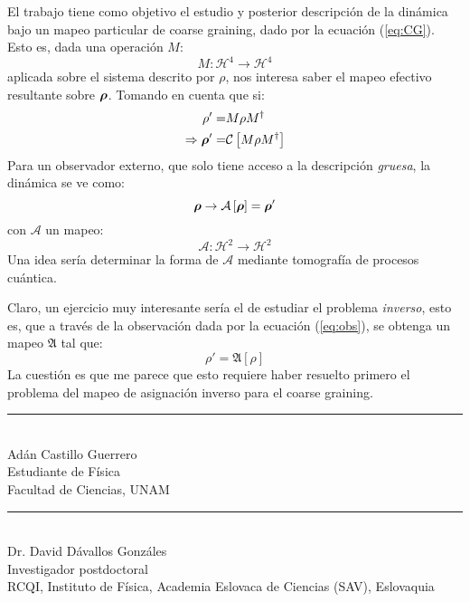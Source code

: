 \documentclass[onecolumn,11pt]{article}
\newcommand{\Cc}{\mathcal{C}} %
\newcommand{\Hh}{\mathcal{H}} %
\newcommand{\CG}[1]{\Cc\left[#1\right]}
\newcommand*{\B}[1]{\ifmmode\bm{#1}\else\textbf{#1}\fi}
\begin{document}
El trabajo tiene como objetivo el estudio y posterior descripción de la dinámica bajo un mapeo particular de coarse graining, dado por la ecuación (\ref{eq:CG}). Esto es, dada una operación $M$:
\begin{equation}
    M:\Hh^{4}\rightarrow\Hh^{4}
\end{equation}
aplicada sobre el sistema descrito por $\rho$, nos interesa saber el mapeo efectivo resultante sobre $\B{\rho}$. Tomando en cuenta que si:
\begin{align}
    \rho'=&M\rho M^{\dag}\\
    \Rightarrow \B{\rho}'=&\CG{M\rho M^{\dag}}
\end{align}
Para un observador externo, que solo tiene acceso a la descripción \textit{gruesa}, la dinámica se ve como:
\begin{equation}\label{eq:obs}
    \B{\rho}\rightarrow\mathcal{A}\left[\B{\rho}\right]=\B{\rho}'
\end{equation}
con $\mathcal{A}$ un mapeo:
\begin{equation}
    \mathcal{A}:\Hh^{2}\rightarrow\Hh^{2}
\end{equation}
Una idea sería determinar la forma de $\mathcal{A}$ mediante tomografía de procesos cuántica. 

Claro, un ejercicio muy interesante sería el de estudiar el problema \textit{inverso}, esto es, que a través de la observación dada por la ecuación (\ref{eq:obs}), se obtenga un mapeo $\mathfrak{A}$ tal que:
\begin{equation}
    \rho'=\mathfrak{A}\left[\rho\right]
\end{equation}
La cuestión es que me parece que esto requiere haber resuelto primero el problema del mapeo de asignación inverso para el coarse graining.


\begin{center}
    \rule{200pt}{0.4pt}\\
    Adán Castillo Guerrero \\
    Estudiante de Física \\
    Facultad de Ciencias, UNAM \\
    
\end{center}

\vspace{1.0cm}

\begin{center}
    \rule{200pt}{0.4pt}\\
    Dr. David Dávallos Gonzáles \\
    Investigador postdoctoral \\
    RCQI, Instituto de Física, Academia Eslovaca de Ciencias (SAV), Eslovaquia\\
    
\end{center}
\end{document}
